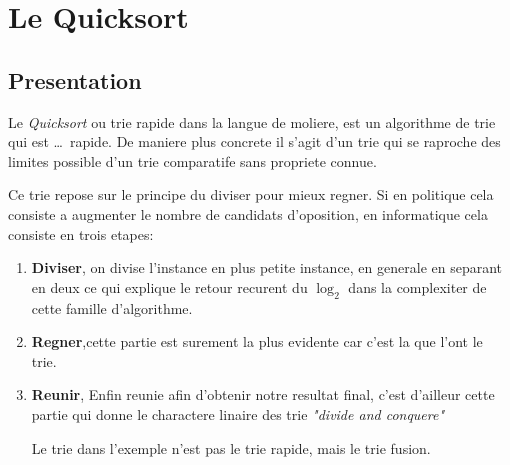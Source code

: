 \documentclass[French,Hoar.tex]{subfiles}
\begin{document}
  \section{Le Quicksort}
  \subsection{Presentation}
  Le \emph{Quicksort} ou trie rapide dans la langue de moliere, est un algorithme de trie qui est \ldots \ rapide.
  De maniere plus concrete il s'agit d'un trie qui se raproche des limites possible d'un trie comparatife sans
  propriete connue.

  Ce trie repose sur le principe du diviser pour mieux regner. Si en politique cela consiste a augmenter le nombre
  de candidats d'oposition, en informatique cela consiste en trois etapes:
  \begin{enumerate}
    \item \textbf{\color{Nred}Diviser}, on divise l'instance en plus petite instance, en generale en separant en deux ce qui
      explique le retour recurent du $\log_2$ dans la complexiter de cette famille d'algorithme.
    \item \textbf{\color{Nred}Regner},cette partie est surement la plus evidente car c'est la que l'ont le trie.
    \item \textbf{\color{Nred}Reunir}, Enfin reunie afin d'obtenir notre resultat final, c'est d'ailleur cette partie qui donne
    le charactere linaire des trie \emph{"divide and conquere"}

    Le trie dans l'exemple n'est pas le trie rapide, mais le trie fusion. 
  \end{enumerate}
\end{document}
